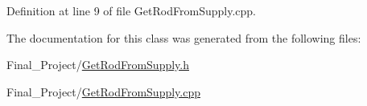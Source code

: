 Definition at line 9 of file Get\-Rod\-From\-Supply.\-cpp.



The documentation for this class was generated from the following files\-:\begin{DoxyCompactItemize}
\item 
Final\-\_\-\-Project/\hyperlink{GetRodFromSupply_8h}{Get\-Rod\-From\-Supply.\-h}\item 
Final\-\_\-\-Project/\hyperlink{GetRodFromSupply_8cpp}{Get\-Rod\-From\-Supply.\-cpp}\end{DoxyCompactItemize}
